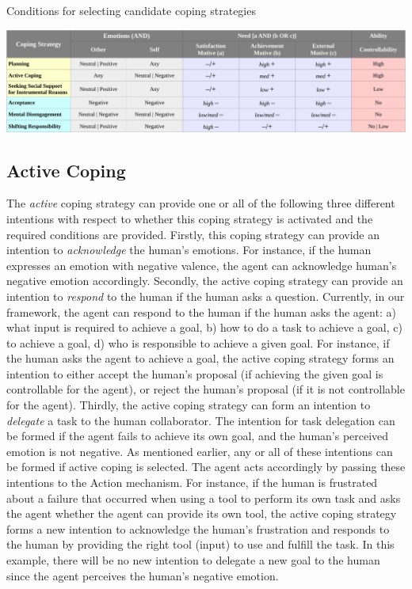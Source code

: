 \documentclass[12pt]{report}
\begin{document}
\begin{table}
  \centering
  \caption{Conditions for selecting candidate coping strategies}
  \label{fig:coping_strategies}
  \includegraphics[width=1\textwidth]{figure/coping_algorithms_short_croped.pdf}
\end{table}

\subsection{Active Coping}
\label{sec:active-coping}
The \textit{active} coping strategy can provide one or all of the following
three different intentions with respect to whether this coping strategy is
activated and the required conditions are provided. Firstly, this coping
strategy can provide an intention to \textit{acknowledge} the human's emotions.
For instance, if the human expresses an emotion with negative valence, the agent
can acknowledge human's negative emotion accordingly. Secondly, the active
coping strategy can provide an intention to \textit{respond} to the human if
the human asks a question. Currently, in our framework, the agent can respond to
the human if the human asks the agent: a) what input is required to achieve a
goal, b) how to do a task to achieve a goal, c) to achieve a goal, d) who is
responsible to achieve a given goal. For instance, if the human asks the agent
to achieve a goal, the active coping strategy forms an intention to either
accept the human's proposal (if achieving the given goal is controllable for the
agent), or reject the human's proposal (if it is not controllable for the
agent). Thirdly, the active coping strategy can form an intention to
\textit{delegate} a task to the human collaborator. The intention for task
delegation can be formed if the agent fails to achieve its own goal, and the
human's perceived emotion is not negative. As mentioned earlier, any or all of
these intentions can be formed if active coping is selected. The agent acts
accordingly by passing these intentions to the Action mechanism. For instance,
if the human is frustrated about a failure that occurred when using a tool to
perform its own task and asks the agent whether the agent can provide its own
tool, the active coping strategy forms a new intention to acknowledge the
human's frustration and responds to the human by providing the right tool
(input) to use and fulfill the task. In this example, there will be no new
intention to delegate a new goal to the human since the agent perceives the
human's negative emotion.
\end{document}
